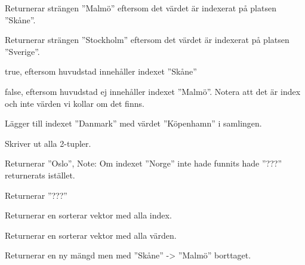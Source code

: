 {{\Subtask {}

\Subtask {}

\Subtask {}

\Subtask {}

\Subtask {}

\Subtask {}

\Subtask {}

\Subtask {}

\Subtask {}

\Subtask {}

\Subtask {}

\Subtask {}

\Subtask {}



\SOLUTION


\TaskSolved \what


\SubtaskSolved
Returnerar strängen ''Malmö'' eftersom det värdet är indexerat på platsen ''Skåne''.

\SubtaskSolved
Returnerar strängen ''Stockholm'' eftersom det värdet är indexerat på platsen ''Sverige''.

\SubtaskSolved
true, eftersom huvudstad innehåller indexet ''Skåne''

\SubtaskSolved
false, eftersom huvudstad ej innehåller indexet ''Malmö''. Notera att det är index och inte värden vi
kollar om det finns.

\SubtaskSolved
Lägger till indexet ''Danmark'' med värdet ''Köpenhamn'' i samlingen.

\SubtaskSolved
Skriver ut alla 2-tupler.

\SubtaskSolved
Returnerar ''Oslo'', Note: Om indexet ''Norge'' inte hade funnits hade ''???'' returnerats istället.

\SubtaskSolved
Returnerar ''???''

\SubtaskSolved
Returnerar en sorterar vektor med alla index.

\SubtaskSolved
Returnerar en sorterar vektor med alla värden.

\SubtaskSolved
Returnerar en ny mängd men med ''Skåne'' -> ''Malmö'' borttaget.

}}
